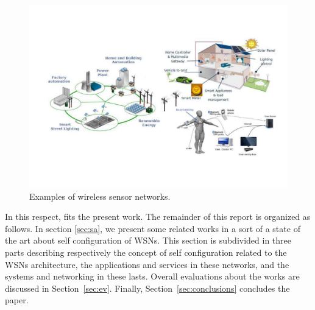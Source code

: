\begin{figure}[t]
\vspace{-4mm}
\centering
 \includegraphics[width=\columnwidth]{fig/fig}
 \vspace{-4mm} 
 \caption{Examples of wireless sensor networks.}
 \vspace{-4mm}
  \label{fig:scenario}
\end{figure}


In this respect, fits the present work.
The remainder of this report is organized as follows. In section
\ref{sec:sa}, we present some related works in a sort of a state of the art
about self configuration of WSNs. This section is subdivided in three parts
describing respectively the concept of self configuration related to the WSNs architecture, the applications and services in these networks, and the systems
and networking in these lasts. Overall evaluations about the works are
discussed in Section~\ref{sec:ev}. Finally, Section~\ref{sec:conclusions} concludes the paper.

